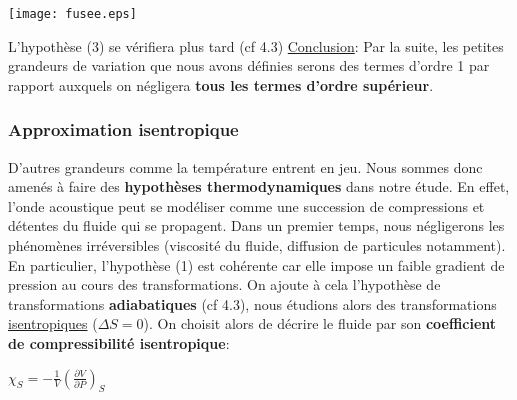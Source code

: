 \documentclass[a4paper, 12pt]{article}
\begin{document}
\begin{center}
{\texttt{[image: fusee.eps]}}
\end{center}
L'hypothèse (3) se vérifiera plus tard (cf 4.3)\newline
\underline{Conclusion}: Par la suite, les petites grandeurs de variation que nous avons définies serons des termes d'ordre 1 par rapport auxquels on négligera \textbf{tous les termes d'ordre supérieur}.

\subsubsection{Approximation isentropique}
D'autres grandeurs comme la température entrent en jeu. Nous sommes donc amenés à faire des \textbf{hypothèses thermodynamiques} dans notre étude. En effet, l'onde acoustique peut se modéliser comme une succession de compressions et détentes du fluide qui se propagent. Dans un premier temps, nous négligerons les phénomènes irréversibles (viscosité du fluide, diffusion de particules notamment). En particulier, l'hypothèse (1) est cohérente car elle impose un faible gradient de pression au cours des transformations.\newline
On ajoute à cela l'hypothèse de transformations \textbf{adiabatiques} (cf 4.3), nous étudions alors des transformations \underline{isentropiques} ($\Delta S=0$). \newline \newline
On choisit alors de décrire le fluide par son \textbf{coefficient de compressibilité isentropique}:
\begin{center}
$\chi_S=-\frac{1}{V}{(\frac{\partial V}{\partial P})}_S$
\end{center}
\end{document}
